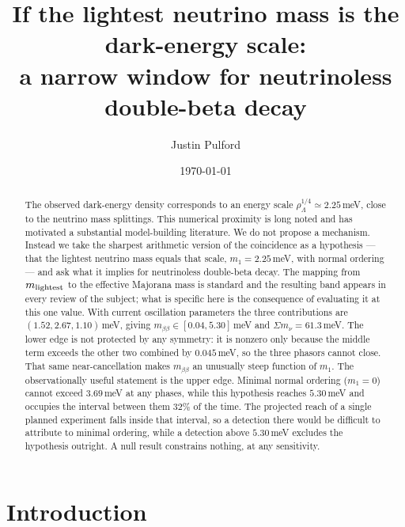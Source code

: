 \documentclass[aps,prd,twocolumn,superscriptaddress,nofootinbib,10pt]{revtex4-2}
\begin{document}
\title{If the lightest neutrino mass is the dark-energy scale:\\
a narrow window for neutrinoless double-beta decay}

\author{Justin Pulford}

\date{\today}

\begin{abstract}
The observed dark-energy density corresponds to an energy scale
$\rho_\Lambda^{1/4} \simeq 2.25\,$meV, close to the neutrino mass splittings. This numerical
proximity is long noted and has motivated a substantial model-building literature. We do not
propose a mechanism. Instead we take the sharpest arithmetic version of the coincidence as a
hypothesis --- that the lightest neutrino mass equals that scale, $m_1 = 2.25\,$meV, with normal
ordering --- and ask what it implies for neutrinoless double-beta decay. The mapping from
$m_{\rm lightest}$ to the effective Majorana mass is standard and the resulting band appears in
every review of the subject; what is specific here is the consequence of evaluating it at this one
value. With current oscillation parameters the three contributions are
$(1.52, 2.67, 1.10)\,$meV, giving $m_{\beta\beta} \in [0.04, 5.30]\,$meV and
$\Sigma m_\nu = 61.3\,$meV. The lower edge is not protected by any symmetry: it is nonzero only
because the middle term exceeds the other two combined by $0.045\,$meV, so the three phasors cannot
close. That same near-cancellation makes $m_{\beta\beta}$ an unusually steep function of $m_1$. The
observationally useful statement is the upper edge. Minimal normal ordering ($m_1 = 0$) cannot
exceed $3.69\,$meV at any phases, while this hypothesis reaches $5.30\,$meV and occupies the
interval between them $32\%$ of the time. The projected reach of a single planned experiment falls
inside that interval, so a detection there would be difficult to attribute to minimal ordering,
while a detection above $5.30\,$meV excludes the hypothesis outright. A null result constrains
nothing, at any sensitivity.
\end{abstract}

\maketitle

\section{Introduction}\label{sec:intro}
\end{document}

